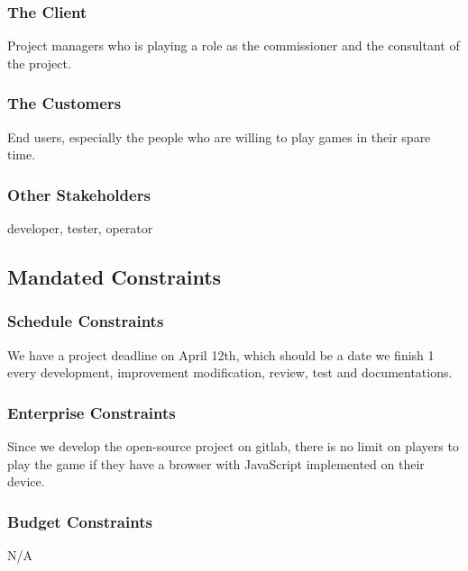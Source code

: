 \documentclass[12pt, titlepage]{article}
\begin{document}
\subsubsection{The Client}
Project managers who is playing a role as the commissioner and the consultant of the project.

\subsubsection{The Customers}
End users, especially the people who are willing to play games in their spare time.

\subsubsection{Other Stakeholders}
developer, tester, operator

\subsection{Mandated Constraints}
\subsubsection{Schedule Constraints}
We have a project deadline on April 12th, which should be a date we finish
1
 every development, improvement modification, review, test and documentations. 

\subsubsection{Enterprise Constraints}
Since we develop the open-source project on gitlab, there is no limit on players to play the game if they have a browser with JavaScript implemented on their device.

\subsubsection*{Budget Constraints}
N/A
\end{document}
